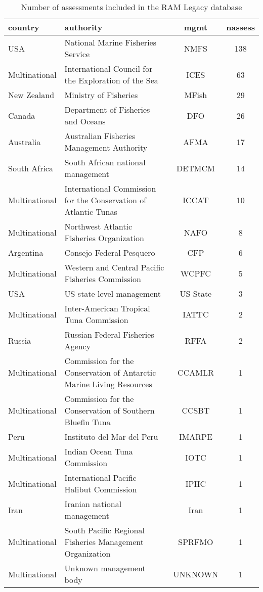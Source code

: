 \begin{table}[ht]
\begin{center}
\caption{Number of assessments included in the RAM Legacy database}
\label{tab:mgmt}
\begin{tabular}{p{3cm}p{5cm}cc}
  \hline
country & authority & mgmt & nassess \\ 
  \hline
USA & National Marine Fisheries Service & NMFS & 138 \\ 
  Multinational & International Council for the Exploration of the Sea & ICES &  63 \\ 
  New Zealand & Ministry of Fisheries & MFish &  29 \\ 
  Canada & Department of Fisheries and Oceans & DFO &  26 \\ 
  Australia & Australian Fisheries Management Authority & AFMA &  17 \\ 
  South Africa & South African national management & DETMCM &  14 \\ 
  Multinational & International Commission for the Conservation of Atlantic Tunas & ICCAT &  10 \\ 
  Multinational & Northwest Atlantic Fisheries Organization & NAFO &   8 \\ 
  Argentina & Consejo Federal Pesquero & CFP &   6 \\ 
  Multinational & Western and Central Pacific Fisheries Commission & WCPFC &   5 \\ 
  USA & US state-level management & US State &   3 \\ 
  Multinational & Inter-American Tropical Tuna Commission & IATTC &   2 \\ 
  Russia & Russian Federal Fisheries Agency & RFFA &   2 \\ 
  Multinational & Commission for the Conservation of Antarctic Marine Living Resources & CCAMLR &   1 \\ 
  Multinational & Commission for the Conservation of Southern Bluefin Tuna & CCSBT &   1 \\ 
  Peru & Instituto del Mar del Peru & IMARPE &   1 \\ 
  Multinational & Indian Ocean Tuna Commission & IOTC &   1 \\ 
  Multinational & International Pacific Halibut Commission & IPHC &   1 \\ 
  Iran & Iranian national management & Iran &   1 \\ 
  Multinational & South Pacific Regional Fisheries Management Organization & SPRFMO &   1 \\ 
  Multinational & Unknown management body & UNKNOWN &   1 \\ 
   \hline
\end{tabular}
\end{center}
\end{table}
